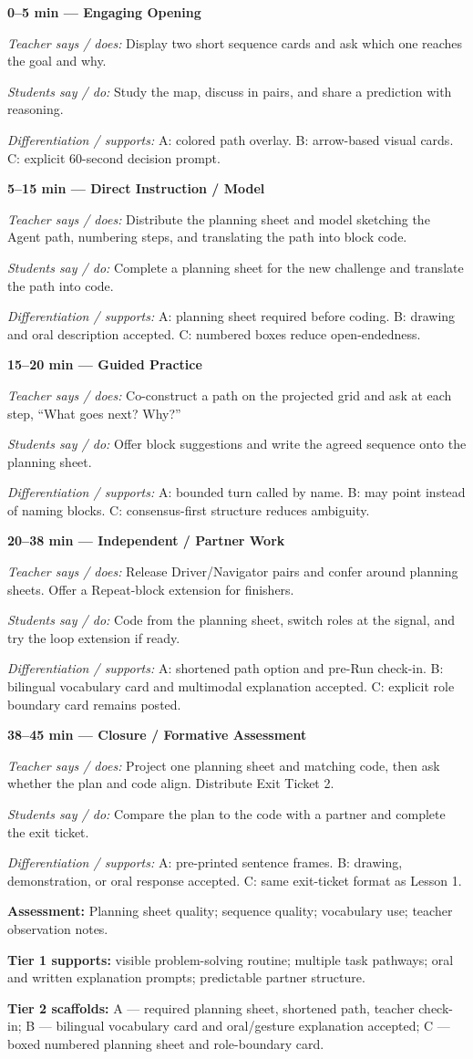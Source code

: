 \documentclass[12pt]{article}
\newcommand{\lessonphase}[5]{%
\noindent\textbf{\color{brickRed}#1 --- #2}\par
\textit{Teacher says / does:} #3\par
\textit{Students say / do:} #4\par
\textit{Differentiation / supports:} #5\par\medskip
}
\begin{document}
\begin{designbox}
\vspace{-0.1cm}
\lessonphase{0--5 min}{Engaging Opening}
{Display two short sequence cards and ask which one reaches the goal and why.}
{Study the map, discuss in pairs, and share a prediction with reasoning.}
{A: colored path overlay. B: arrow-based visual cards. C: explicit 60-second decision prompt.}

\vspace{-0.1cm}
\lessonphase{5--15 min}{Direct Instruction / Model}
{Distribute the planning sheet and model sketching the Agent path, numbering steps, and translating the path into block code.}
{Complete a planning sheet for the new challenge and translate the path into code.}
{A: planning sheet required before coding. B: drawing and oral description accepted. C: numbered boxes reduce open-endedness.}

\vspace{-0.1cm}
\lessonphase{15--20 min}{Guided Practice}
{Co-construct a path on the projected grid and ask at each step, ``What goes next? Why?''}
{Offer block suggestions and write the agreed sequence onto the planning sheet.}
{A: bounded turn called by name. B: may point instead of naming blocks. C: consensus-first structure reduces ambiguity.}

\vspace{-0.1cm}
\lessonphase{20--38 min}{Independent / Partner Work}
{Release Driver/Navigator pairs and confer around planning sheets. Offer a Repeat-block extension for finishers.}
{Code from the planning sheet, switch roles at the signal, and try the loop extension if ready.}
{A: shortened path option and pre-Run check-in. B: bilingual vocabulary card and multimodal explanation accepted. C: explicit role boundary card remains posted.}

\vspace{-0.1cm}
\lessonphase{38--45 min}{Closure / Formative Assessment}
{Project one planning sheet and matching code, then ask whether the plan and code align. Distribute Exit Ticket 2.}
{Compare the plan to the code with a partner and complete the exit ticket.}
{A: pre-printed sentence frames. B: drawing, demonstration, or oral response accepted. C: same exit-ticket format as Lesson 1.}
\end{designbox}

\begin{assessbox}
\textbf{Assessment:} Planning sheet quality; sequence quality; vocabulary use; teacher observation notes.\par
\textbf{Tier 1 supports:} visible problem-solving routine; multiple task pathways; oral and written explanation prompts; predictable partner structure.\par
\textbf{Tier 2 scaffolds:} A --- required planning sheet, shortened path, teacher check-in; B --- bilingual vocabulary card and oral/gesture explanation accepted; C --- boxed numbered planning sheet and role-boundary card.
\end{assessbox}
\end{document}
